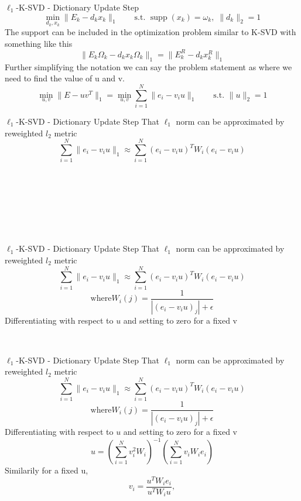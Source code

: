 \documentclass{beamer}
\begin{document}
\begin{frame}{$\ell_1$-K-SVD - Dictionary Update Step}
    \[
    \min_{d_k,x_k} \|E_k-d_kx_k\|_1
    \qquad
    \text{s.t. } \operatorname{supp}(x_k)=\omega_k,\; \|d_k\|_2=1
    \]
    The support can be included in the optimization problem similar to K-SVD with something like this 
    \[
    \|E_k\Omega_k-d_kx_k\Omega_k\|_1
    =
    \|E_k^R-d_kx_k^R\|_1
    \]
    Further simplifying the notation we can say the problem statement as where we need to find the value of u and v.
    \[
    \min_{u,v} \|E-uv^T\|_1
    =
    \min_{u,v}\sum_{i=1}^{N}\|e_i-v_iu\|_1
    \qquad
    \text{s.t. } \|u\|_2=1
    \]
\end{frame}

\begin{frame}{$\ell_1$-K-SVD - Dictionary Update Step}
    That $\ell_1$ norm can be approximated by reweighted $l_2$ metric 
    \[
    \sum_{i=1}^{N}\|e_i-v_iu\|_1
    \approx
    \sum_{i=1}^{N}(e_i-v_iu)^T W_i (e_i-v_iu)
    \]
    \[
    \phantom{\text{where}
    W_i(j)=\frac{1}{|(e_i-v_iu)_j|+\epsilon}}
    \]
    \phantom{Differentiating with respect to $u$ and setting to zero for a fixed v}
    \[
    \phantom{
    u=
    \left(\sum_{i=1}^{N} v_i^2 W_i\right)^{-1}
    \left(\sum_{i=1}^{N} v_i W_i e_i\right)}
    \]
    \phantom{Similarily for a fixed u,}
    \[
    \phantom{
    v_i=\frac{u^T W_i e_i}{u^T W_i u},
    }
    \]
    \phantom{This is for one iteration. This is done iteratively for 10 iterations.}
\end{frame}

\begin{frame}{$\ell_1$-K-SVD - Dictionary Update Step}
    That $\ell_1$ norm can be approximated by reweighted $l_2$ metric 
    \[
    \sum_{i=1}^{N}\|e_i-v_iu\|_1
    \approx
    \sum_{i=1}^{N}(e_i-v_iu)^T W_i (e_i-v_iu)
    \]
    \[
    \text{where}
    W_i(j)=\frac{1}{|(e_i-v_iu)_j|+\epsilon}
    \]
    Differentiating with respect to $u$ and setting to zero for a fixed v
    \[
    \phantom{
    v_i=\frac{u^T W_i e_i}{u^T W_i u},
    }
    \]
    \phantom{This is for one iteration. This is done iteratively for 10 iterations.}
\end{frame}

\begin{frame}{$\ell_1$-K-SVD - Dictionary Update Step}
    That $\ell_1$ norm can be approximated by reweighted $l_2$ metric 
    \[
    \sum_{i=1}^{N}\|e_i-v_iu\|_1
    \approx
    \sum_{i=1}^{N}(e_i-v_iu)^T W_i (e_i-v_iu)
    \]
    \[
    \text{where}
    W_i(j)=\frac{1}{|(e_i-v_iu)_j|+\epsilon}
    \]
    Differentiating with respect to $u$ and setting to zero for a fixed v
    \[
    u=
    \left(\sum_{i=1}^{N} v_i^2 W_i\right)^{-1}
    \left(\sum_{i=1}^{N} v_i W_i e_i\right)
    \]
    Similarily for a fixed u, 
    \[
    v_i=\frac{u^T W_i e_i}{u^T W_i u},
    \]
\end{frame}
\end{document}
